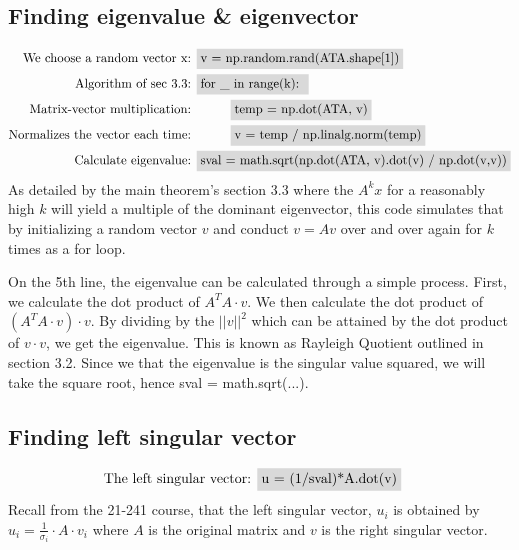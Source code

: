 \documentclass[12pt]{article}
\begin{document}
\vspace{-8pt}
\subsection{Finding eigenvalue \& eigenvector}
\vspace{-8pt}
\begin{align*}
    \mbox{We choose a random vector x:  } & \colorbox{gray!30}{\textnormal{v = np.random.rand(ATA.shape[1])}}\\
     \mbox{Algorithm of sec 3.3:  } & \colorbox{gray!30}{\textnormal{for \_ in range(k):  }}\\ 
    \mbox{Matrix-vector multiplication:  } & \textnormal{~~~~~~~~}\colorbox{gray!30}{\textnormal{temp = np.dot(ATA, v)}}\\ 
    \mbox{Normalizes the vector each time:  } & \textnormal{~~~~~~~~} \colorbox{gray!30}{\textnormal{v = temp / np.linalg.norm(temp)}}\\
    \mbox{Calculate eigenvalue:  } & \colorbox{gray!30}{sval = math.sqrt(np.dot(ATA, v).dot(v) / np.dot(v,v))}\\
\end{align*}
As detailed by the main theorem's section 3.3 where the $A^kx$ for a reasonably high $k$ will yield a multiple of the dominant eigenvector, this code simulates that by initializing a random vector $v$ and conduct $v = Av$ over and over again for $k$ times as a for loop. 

On the 5th line, the eigenvalue can be calculated through a simple process. First, we calculate the dot product of $A^TA\cdot v$. We then calculate the dot product of $(A^TA \cdot v) \cdot v$. By dividing by the $||v||^2$ which can be attained by the dot product of $v\cdot v$, we get the eigenvalue. This is known as Rayleigh Quotient outlined in section 3.2. Since we that the eigenvalue is the singular value squared, we will take the square root, hence \colorbox{gray!30}{sval = math.sqrt(...)}.

\vspace{-8pt}
\subsection{Finding left singular vector}
\vspace{-8pt}
\begin{align*}
    \mbox{The left singular vector:  } & \colorbox{gray!30}{\textnormal{u = (1/sval)*A.dot(v)}}
\end{align*}
Recall from the 21-241 course, that the left singular vector, $u_i$ is obtained by $u_i = \frac{1}{\sigma_i}\cdot A\cdot v_i$ where $A$ is the original matrix and $v$ is the right singular vector.
    
\end{document}
